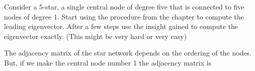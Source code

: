 Consider a 5-star, a single central node of degree five that is connected to five nodes of degree 1. Start using the procedure from the chapter to compute the leading eigenvector. After a few steps use the insight gained to compute the eigenvector exactly. (This might be very hard or very easy)  

\solution
The adjacency matrix of the star network depends on the ordering of the nodes. But, if we make the central node number 1 the adjacency matrix is 

